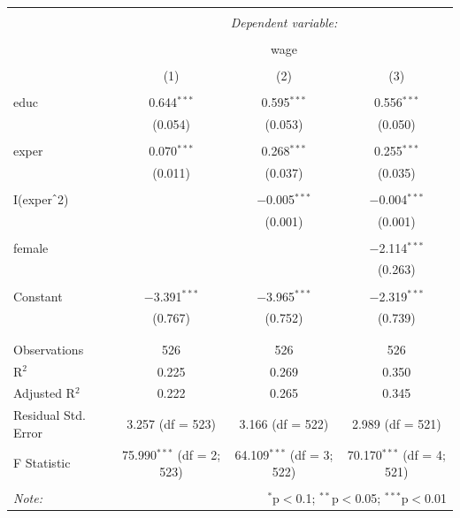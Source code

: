 \documentclass[11pt]{article}
\theoremstyle{definition}
\begin{document}
\begin{table}[h] \centering 
  \caption{} 
  \label{} 
\begin{tabular}{@{\extracolsep{5pt}}lccc} 
\\[-1.8ex]\hline 
\hline \\[-1.8ex] 
 & \multicolumn{3}{c}{\textit{Dependent variable:}} \\ 
\cline{2-4} 
\\[-1.8ex] & \multicolumn{3}{c}{wage} \\ 
\\[-1.8ex] & (1) & (2) & (3)\\ 
\hline \\[-1.8ex] 
 educ & 0.644$^{***}$ & 0.595$^{***}$ & 0.556$^{***}$ \\ 
  & (0.054) & (0.053) & (0.050) \\ 
  & & & \\ 
 exper & 0.070$^{***}$ & 0.268$^{***}$ & 0.255$^{***}$ \\ 
  & (0.011) & (0.037) & (0.035) \\ 
  & & & \\ 
 I(exper$\hat{\mkern6mu}$2) &  & $-$0.005$^{***}$ & $-$0.004$^{***}$ \\ 
  &  & (0.001) & (0.001) \\ 
  & & & \\ 
 female &  &  & $-$2.114$^{***}$ \\ 
  &  &  & (0.263) \\ 
  & & & \\ 
 Constant & $-$3.391$^{***}$ & $-$3.965$^{***}$ & $-$2.319$^{***}$ \\ 
  & (0.767) & (0.752) & (0.739) \\ 
  & & & \\ 
\hline \\[-1.8ex] 
Observations & 526 & 526 & 526 \\ 
R$^{2}$ & 0.225 & 0.269 & 0.350 \\ 
Adjusted R$^{2}$ & 0.222 & 0.265 & 0.345 \\ 
Residual Std. Error & 3.257 (df = 523) & 3.166 (df = 522) & 2.989 (df = 521) \\ 
F Statistic & 75.990$^{***}$ (df = 2; 523) & 64.109$^{***}$ (df = 3; 522) & 70.170$^{***}$ (df = 4; 521) \\ 
\hline 
\hline \\[-1.8ex] 
\textit{Note:}  & \multicolumn{3}{r}{$^{*}$p$<$0.1; $^{**}$p$<$0.05; $^{***}$p$<$0.01} \\ 
\end{tabular} 
\end{table} 
\end{document}
